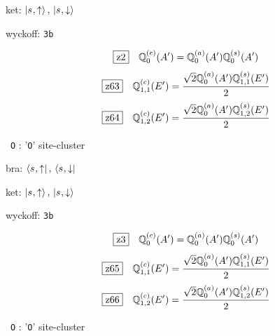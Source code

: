 \documentclass[fleqn,10pt,landscape]{jsarticle}
\begin{document}
\noindent\quad * ket: $\ket{s_{},\uparrow},\, \ket{s_{},\downarrow}$

\noindent\quad * wyckoff: \texttt{3b}

\begin{dmath*}
\hspace*{3mm}\fbox{z2}\quad \mathbb{Q}_{0}^{(c)}(A^{\prime})=\mathbb{Q}_{0}^{(a)}(A^{\prime}) \mathbb{Q}_{0}^{(s)}(A^{\prime})
\end{dmath*}
\begin{dmath*}
\hspace*{3mm}\fbox{z63}\quad \mathbb{Q}_{1,1}^{(c)}(E^{\prime})=\frac{\sqrt{2} \mathbb{Q}_{0}^{(a)}(A^{\prime}) \mathbb{Q}_{1,1}^{(s)}(E^{\prime})}{2}
\end{dmath*}
\begin{dmath*}
\hspace*{3mm}\fbox{z64}\quad \mathbb{Q}_{1,2}^{(c)}(E^{\prime})=\frac{\sqrt{2} \mathbb{Q}_{0}^{(a)}(A^{\prime}) \mathbb{Q}_{1,2}^{(s)}(E^{\prime})}{2}
\end{dmath*}
\vspace{5mm}

\noindent\textbullet\, \texttt{O} : '\texttt{O}' site-cluster

\noindent\quad * bra: $\bra{s_{},\uparrow},\, \bra{s_{},\downarrow}$

\noindent\quad * ket: $\ket{s_{},\uparrow},\, \ket{s_{},\downarrow}$

\noindent\quad * wyckoff: \texttt{3b}

\begin{dmath*}
\hspace*{3mm}\fbox{z3}\quad \mathbb{Q}_{0}^{(c)}(A^{\prime})=\mathbb{Q}_{0}^{(a)}(A^{\prime}) \mathbb{Q}_{0}^{(s)}(A^{\prime})
\end{dmath*}
\begin{dmath*}
\hspace*{3mm}\fbox{z65}\quad \mathbb{Q}_{1,1}^{(c)}(E^{\prime})=\frac{\sqrt{2} \mathbb{Q}_{0}^{(a)}(A^{\prime}) \mathbb{Q}_{1,1}^{(s)}(E^{\prime})}{2}
\end{dmath*}
\begin{dmath*}
\hspace*{3mm}\fbox{z66}\quad \mathbb{Q}_{1,2}^{(c)}(E^{\prime})=\frac{\sqrt{2} \mathbb{Q}_{0}^{(a)}(A^{\prime}) \mathbb{Q}_{1,2}^{(s)}(E^{\prime})}{2}
\end{dmath*}
\vspace{5mm}

\noindent\textbullet\, \texttt{O} : '\texttt{O}' site-cluster
\end{document}
